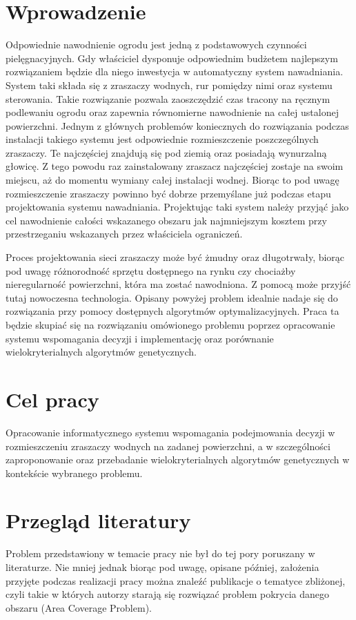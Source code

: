 \documentclass[twoside]{iisthesis}
\begin{document}
\section{Wprowadzenie}
Odpowiednie nawodnienie ogrodu jest jedną z podstawowych czynności pielęgnacyjnych. Gdy właściciel dysponuje odpowiednim budżetem najlepszym rozwiązaniem będzie dla niego inwestycja w automatyczny system nawadniania. System taki składa się z zraszaczy wodnych, rur pomiędzy nimi oraz systemu sterowania. Takie rozwiązanie pozwala zaoszczędzić czas tracony na ręcznym podlewaniu ogrodu oraz zapewnia równomierne nawodnienie na całej ustalonej powierzchni. Jednym z głównych problemów koniecznych do rozwiązania podczas instalacji takiego systemu jest odpowiednie rozmieszczenie poszczególnych zraszaczy. Te najczęściej znajdują się pod ziemią oraz posiadają wynurzalną głowicę. Z tego powodu raz zainstalowany zraszacz najczęściej zostaje na swoim miejscu, aż do momentu wymiany całej instalacji wodnej. Biorąc to pod uwagę rozmieszczenie zraszaczy powinno być dobrze przemyślane już podczas etapu projektowania systemu nawadniania. Projektując taki system należy przyjąć jako cel nawodnienie całości wskazanego obszaru jak najmniejszym kosztem przy przestrzeganiu wskazanych przez właściciela ograniczeń.

Proces projektowania sieci zraszaczy może być żmudny oraz długotrwały, biorąc pod uwagę różnorodność sprzętu dostępnego na rynku czy chociażby nieregularność powierzchni, która ma zostać nawodniona. Z pomocą może przyjść tutaj nowoczesna technologia. Opisany powyżej problem idealnie nadaje się do rozwiązania przy pomocy dostępnych algorytmów optymalizacyjnych. Praca ta będzie skupiać się na rozwiązaniu omówionego problemu poprzez opracowanie systemu wspomagania decyzji i implementację oraz porównanie wielokryterialnych algorytmów genetycznych.

\section{Cel pracy}
Opracowanie informatycznego systemu wspomagania podejmowania decyzji w rozmieszczeniu zraszaczy wodnych na zadanej powierzchni, a w szczególności zaproponowanie oraz przebadanie wielokryterialnych algorytmów genetycznych w kontekście wybranego problemu.

\section{Przegląd literatury}
Problem przedstawiony w temacie pracy nie był do tej pory poruszany w literaturze. Nie mniej jednak biorąc pod uwagę, opisane później, założenia przyjęte podczas realizacji pracy można znaleźć publikacje o tematyce zbliżonej, czyli takie w których autorzy starają się rozwiązać problem pokrycia danego obszaru (Area Coverage Problem).
\end{document}
